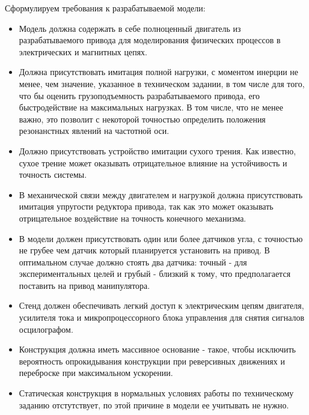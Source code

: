 Сформулируем требования к разрабатываемой модели:
\begin{itemize}
    \item Модель должна содержать в себе полноценный двигатель из разрабатываемого
    привода для моделирования физических процессов в электрических и магнитных цепях.

    \item Должна присутствовать имитация полной нагрузки, с моментом инерции не менее, чем
    значение, указанное в техническом задании, в том числе для того, что бы оценить
    грузоподъемность разрабатываемого привода, его быстродействие на максимальных
    нагрузках. В том числе, что не менее важно, это позволит с некоторой точностью
    определить положения резонанстных явлений на частотной оси.

    \item Должно присутствовать устройство имитации сухого трения. Как
    известно, сухое трение может оказывать отрицательное влияние на устойчивость
    и точность системы.

    \item В механической связи между двигателем и нагрузкой должна присутствовать имитация
    упругости редуктора привода, так как это может оказывать отрицательное воздействие
    на точность конечного механизма.

    \item В модели должен присутствовать один или более датчиков угла, с точностью не
    грубее чем датчик который планируется установить на привод. В оптимальном случае должно
    стоять два датчика: точный - для экспериментальных целей и грубый - близкий
    к тому, что предполагается поставить на привод манипулятора.

    \item Стенд должен обеспечивать легкий доступ к электрическим цепям двигателя,
    усилителя тока и микропроцессорного блока управления для снятия сигналов
    осцилографом.

    \item Конструкция должна иметь массивное основание - такое, чтобы
    исключить вероятность опрокидывания конструкции при реверсивных движениях
    и переброске при максимальном ускорении.

    \item Статическая конструкция в нормальных условиях работы по техническому
    заданию отстутствует, по этой причине в модели ее учитывать не нужно.
\end{itemize}

\endinput
